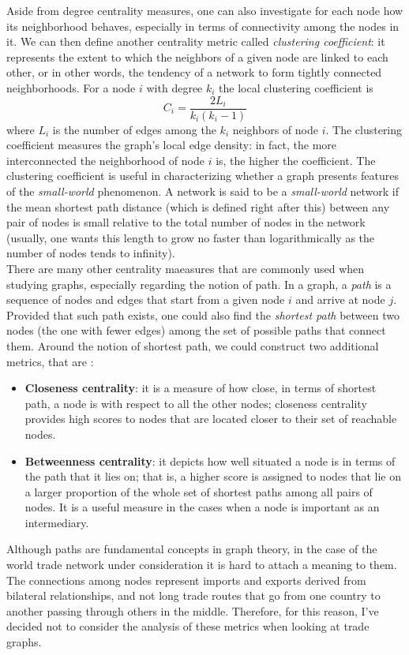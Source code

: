 Aside from degree centrality measures, one can also investigate for each node how its neighborhood behaves, especially in terms of connectivity among the nodes in it. We can then define another centrality metric called \textit{clustering coefficient}: it represents the extent to which the neighbors of a given node are linked to each other, or in other words, the tendency of a network to form tightly connected neighborhoods. For a node $i$ with degree $k_i$ the local clustering coefficient is
\[
    C_i = \frac{2 L_i}{k_i(k_i-1)}
\]
where $L_i$ is the number of edges among the $k_i$ neighbors of node $i$. The clustering coefficient measures the graph's local edge density: in fact, the more interconnected the neighborhood of node $i$ is, the higher the coefficient. The clustering coefficient is useful in characterizing whether a graph presents features of the \textit{small-world} phenomenon. A network is said to be a \textit{small-world} network if the mean shortest path distance (which is defined right after this) between any pair of nodes is small relative to the total number of nodes in the network (usually, one wants this length to grow no faster than logarithmically as the number of nodes tends to infinity).\\
There are many other centrality maeasures that are commonly used when studying graphs, especially regarding the notion of path. In a graph, a \textit{path} is a sequence of nodes and edges that start from a given node $i$ and arrive at node $j$. Provided that such path exists, one could also find the \textit{shortest path} between two nodes (the one with fewer edges) among the set of possible paths that connect them. Around the notion of shortest path, we could construct two additional metrics, that are \cite{benedictis2014bacicepii}:
\begin{itemize}
    \item \textbf{Closeness centrality}: it is a measure of how close, in terms of shortest path, a node is with respect to all the other nodes; closeness centrality provides high scores to nodes that are located closer to their set of reachable nodes.
    \item \textbf{Betweenness centrality}: it depicts how well situated a node is in terms of the path that it lies on; that is, a higher score is assigned to nodes that lie on a larger proportion of the whole set of shortest paths among all pairs of nodes. It is a useful measure in the cases when a node is important as an intermediary.
\end{itemize}
Although paths are fundamental concepts in graph theory, in the case of the world trade network under consideration it is hard to attach a meaning to them. The connections among nodes represent imports and exports derived from bilateral relationships, and not long trade routes that go from one country to another passing through others in the middle. Therefore, for this reason, I've decided not to consider the analysis of these metrics when looking at trade graphs.


